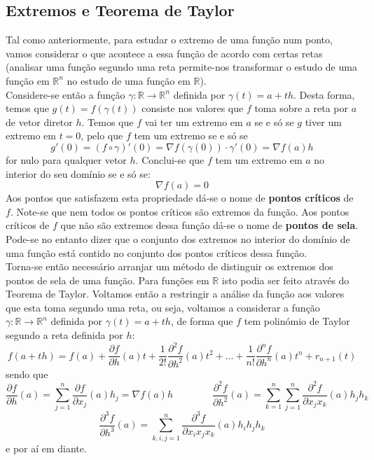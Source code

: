 \documentclass{article}
\newcommand{\R}{\mathbb{R}}
\begin{document}
\subsection{Extremos e Teorema de Taylor}
Tal como anteriormente, para estudar o extremo de uma função num ponto, vamos considerar o que acontece a essa função de acordo com certas retas (analisar uma função segundo uma reta permite-nos transformar o estudo de uma função em $\R^n$ no estudo de uma função em $\R$).\\
Considere-se então a função $\gamma: \R \to \R^n$ definida por $\gamma (t) = a + th$. Desta forma, temos que $g(t) = f(\gamma(t))$ consiste nos valores que $f$ toma sobre a reta por $a$ de vetor diretor $h$. Temos que $f$ vai ter um extremo em $a$ se e só se $g$ tiver um extremo em $t=0$, pelo que $f$ tem um extremo se e só se
$$
g'(0) = (f \circ \gamma )' (0) = \nabla f(\gamma (0)) \cdot \gamma'(0) = \nabla f(a) h
$$
for nulo para qualquer vetor $h$. Conclui-se que $f$ tem um extremo em $a$ no interior do seu domínio se e só se:
$$
\nabla f(a)=0
$$
Aos pontos que satisfazem esta propriedade dá-se o nome de \textbf{pontos críticos} de $f$. Note-se que nem todos os pontos críticos são extremos da função. Aos pontos críticos de $f$ que não são extremos dessa função dá-se o nome de \textbf{pontos de sela}. Pode-se no entanto dizer que o conjunto dos extremos no interior do domínio de uma função está contido no conjunto dos pontos críticos dessa função.\\
Torna-se então necessário arranjar um método de distinguir os extremos dos pontos de sela de uma função. Para funções em $\R$ isto podia ser feito através do Teorema de Taylor. Voltamos então a restringir a análise da função aos valores que esta toma segundo uma reta, ou seja, voltamos a considerar a função $\gamma: \R \to \R^n$ definida por $\gamma (t) = a + th$, de forma que $f$ tem polinómio de Taylor segundo a reta definida por $h$:
$$
f(a+th) = f(a) + \frac{\partial f}{\partial h}(a)t + \frac{1}{2!}\frac{\partial ^2 f}{\partial h^2}(a) t^2 + ... + \frac{1}{n!} \frac{\partial ^n f}{\partial h^n}(a)t^n + r_{n+1}(t)
$$
sendo que
$$
\frac{\partial f}{\partial h}(a) = \sum_{j=1}^n \frac{\partial f}{\partial x_j}(a) h_j = \nabla f(a) h  \quad \quad \quad \quad 
\frac{\partial ^2 f}{\partial h^2}(a) = \sum_{k=1}^n \sum_{j=1}^n \frac{\partial ^2 f}{\partial x_j x_k} (a) h_j h_k 
$$
$$
\frac{\partial ^3 f}{\partial h^3}(a) = \sum_{k,i,j =1}^n \frac{\partial ^3 f}{\partial x_i x_j x_k} (a) h_i h_j h_k
$$
e por aí em diante.\\
\end{document}
